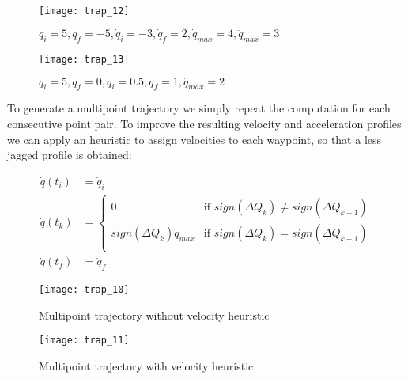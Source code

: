 \newpage

\begin{figure}[H]
\centering
\texttt{[image: trap\_12]}
\caption{$q_i=5,q_f=-5, \dot q_i=-3, \dot q_f=2, \dot q_{max}=4,\ddot q_{max}=3$}
\end{figure}

\begin{figure}[H]
\centering
\texttt{[image: trap\_13]}
\caption{$q_i=5,q_f=0, \dot q_i=0.5, \dot q_f=1, \ddot q_{max}=2$}
\end{figure}

\newpage

To generate a multipoint trajectory we simply repeat the computation for each consecutive point pair. To improve the resulting velocity and acceleration profiles we can apply an heuristic to assign velocities to each waypoint, so that a less jagged profile is obtained:

\begin{align*}
\dot q(t_i)&=\dot q_i\\
\dot q(t_k)&=\begin{cases}
0 & \text{if }sign(\Delta Q_k)\neq sign(\Delta Q_{k+1})\\
sign(\Delta Q_k)\dot q_{max}& \text{if }sign(\Delta Q_k)= sign(\Delta Q_{k+1})\\
\end{cases}\\
\dot q(t_f)&=\dot q_f
\end{align*}

\begin{figure}[H]
\begin{minipage}{0.5\textwidth}
\centering
\texttt{[image: trap\_10]}
\caption{Multipoint trajectory without velocity heuristic}
\label{fig:trap_10}
\end{minipage}
\begin{minipage}{0.5\textwidth}
\centering
\texttt{[image: trap\_11]}
\caption{Multipoint trajectory with velocity heuristic}
\label{fig:trap_11}
\end{minipage}
\end{figure}